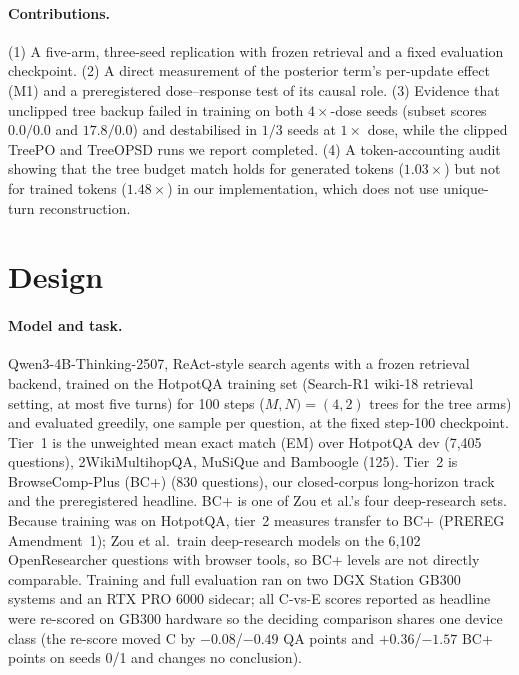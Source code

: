 \documentclass[11pt]{article}
\begin{document}
\paragraph{Contributions.} (1) A five-arm, three-seed replication with
frozen retrieval and a fixed evaluation checkpoint. (2) A direct
measurement of the posterior term's per-update effect (M1) and a
preregistered dose--response test of its causal role. (3) Evidence that
unclipped tree backup failed in training on both $4\times$-dose seeds
(subset scores $0.0/0.0$ and $17.8/0.0$) and destabilised in $1/3$ seeds
at $1\times$ dose, while the clipped TreePO and TreeOPSD runs we report
completed. (4) A token-accounting audit showing that the tree budget
match holds for generated tokens ($1.03\times$) but not for trained
tokens ($1.48\times$) in our implementation, which does not use
unique-turn reconstruction.

\section{Design}
\label{sec:design}

\paragraph{Model and task.} Qwen3-4B-Thinking-2507, ReAct-style search
agents with a frozen retrieval backend, trained on the HotpotQA training
set (Search-R1 \cite{searchr1} wiki-18 retrieval setting, at most five
turns) for 100 steps \mbox{($M,N)=(4,2)$} trees for the tree arms) and
evaluated greedily, one sample per question, at the fixed step-100
checkpoint. Tier~1 is the unweighted mean exact match (EM) over HotpotQA
dev (7{,}405 questions), 2WikiMultihopQA, MuSiQue and Bamboogle (125).
Tier~2 is BrowseComp-Plus (BC+) \cite{bcplus} (830 questions), our
closed-corpus long-horizon track and the preregistered headline. BC+ is
one of Zou et al.'s four deep-research sets. Because training was on
HotpotQA, tier~2 measures transfer to BC+ (PREREG Amendment~1); Zou
et al.\ train deep-research models on the 6{,}102 OpenResearcher
questions \cite{openresearcher} with browser tools, so BC+ levels are
not directly comparable. Training and full evaluation ran on two DGX
Station GB300 systems and an RTX PRO 6000 sidecar; all C-vs-E scores
reported as headline were re-scored on GB300 hardware so the deciding
comparison shares one device class (the re-score moved C by
$-0.08$/$-0.49$ QA points and $+0.36$/$-1.57$ BC+ points on seeds 0/1 and
changes no conclusion).
\end{document}
